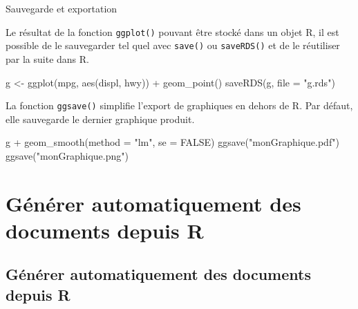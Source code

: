 \documentclass[12pt,handout,ignorenonframetext,]{beamer}
\newenvironment{Shaded}{}{}
\newcommand{\KeywordTok}[1]{\textcolor[rgb]{0.00,0.00,1.00}{{#1}}}
\newcommand{\DataTypeTok}[1]{{#1}}
\newcommand{\StringTok}[1]{\textcolor[rgb]{0.00,0.50,0.50}{{#1}}}
\newcommand{\OtherTok}[1]{\textcolor[rgb]{1.00,0.25,0.00}{{#1}}}
\newcommand{\NormalTok}[1]{{#1}}
\renewenvironment{Shaded}{\begin{snugshade}}{\end{snugshade}}
\begin{document}
\begin{frame}[fragile]{Sauvegarde et exportation}

Le résultat de la fonction \texttt{ggplot()} pouvant être stocké dans un
objet R, il est possible de le sauvegarder tel quel avec \texttt{save()}
ou \texttt{saveRDS()} et de le réutiliser par la suite dans R.

\begin{Shaded}
\begin{Highlighting}[]
\NormalTok{g <-}\StringTok{ }\KeywordTok{ggplot}\NormalTok{(mpg, }\KeywordTok{aes}\NormalTok{(displ, hwy)) +}\StringTok{ }\KeywordTok{geom_point}\NormalTok{()}
\KeywordTok{saveRDS}\NormalTok{(g, }\DataTypeTok{file =} \StringTok{"g.rds"}\NormalTok{)}
\end{Highlighting}
\end{Shaded}

\pause La fonction \texttt{ggsave()} simplifie l'export de graphiques en
dehors de R. Par défaut, elle sauvegarde le dernier graphique produit.

\begin{Shaded}
\begin{Highlighting}[]
\NormalTok{g +}\StringTok{ }\KeywordTok{geom_smooth}\NormalTok{(}\DataTypeTok{method =} \StringTok{"lm"}\NormalTok{, }\DataTypeTok{se =} \OtherTok{FALSE}\NormalTok{)}
\KeywordTok{ggsave}\NormalTok{(}\StringTok{"monGraphique.pdf"}\NormalTok{)}
\KeywordTok{ggsave}\NormalTok{(}\StringTok{"monGraphique.png"}\NormalTok{)}
\end{Highlighting}
\end{Shaded}

\end{frame}

\section{Générer automatiquement des documents depuis
R}\label{generer-automatiquement-des-documents-depuis-r}

\subsection*{Générer automatiquement des documents depuis R}
\end{document}
